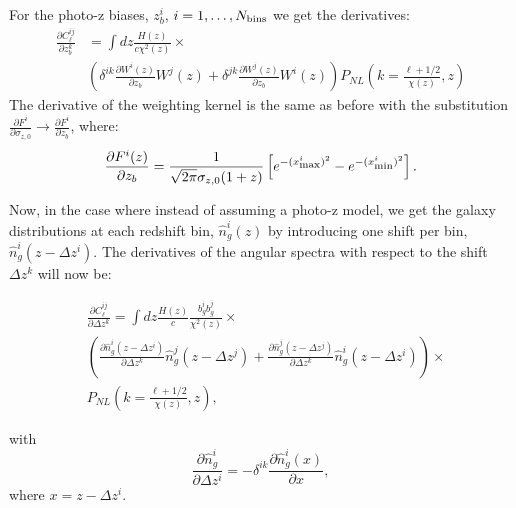 \documentclass[a4paper,fleqn,usenatbib]{mnras}
\begin{document}
For the photo-z biases, $z_b^i$, $i = 1, \dots, N_{\mbox{\scriptsize{bins}}}$ we get the derivatives:
\begin{align}
\frac{\partial C_\ell^{ij}}{\partial z_b^k}  &=  \int  dz \frac{H(z)}{c \chi^2(z)}  \times \nonumber \\   
 & \left(\delta^{ik}\frac{\partial  W^i(z)}{\partial z_b} W^j(z) +
 \delta^{jk}\frac{\partial W^j(z)}{\partial z_b} W^i(z)  \right)P_{NL}\left(k=\frac{\ell+1/2}{\chi(z)},z \right) 
\end{align}
The derivative of the weighting kernel is the same as before with the substitution $\frac{\partial F^i}{\partial \sigma_{z,0}} \to \frac{\partial F^i}{\partial z_b}$, where:
\begin{equation}
\frac{\partial F^i(z)}{\partial z_b}  = \frac{1}{\sqrt{2\pi}\sigma_{z,0}(1+z)} \left[e^{- (x_{\mbox{\scriptsize{max}}}^i)^2} - e^{- (x_{\mbox{\scriptsize{min}}}^i)^2} \right].
\end{equation}

Now, in the case where instead of assuming a photo-z model, we get the galaxy  distributions at each redshift bin, $\hat{n}_g^i(z)$ by introducing one shift per bin, $\hat{n}_g^i(z-\Delta z^i)$. The derivatives of the angular spectra with respect to the shift $\Delta z^k$ will now be:

\begin{align}
&\frac{\partial C_\ell^{ij}}{\partial \Delta z^k}  =  \int  dz \frac{H(z)}{c}\frac{b_g^i b_g^j}{\chi^2(z)} \times \nonumber \\   
 & \left(\frac{\partial \hat{n}_g^i(z - \Delta z^i)}{\partial \Delta z^k}\hat{n}_g^j(z - \Delta z^j)  +
 \frac{\partial \hat{n}_g^j(z - \Delta z^j)}{\partial \Delta z^k} \hat{n}_g^i(z - \Delta z^i)   \right) \times \nonumber \\
 &P_{NL}\left(k=\frac{\ell+1/2}{\chi(z)},z \right), 
\end{align}

with
\begin{equation}
\frac{\partial \hat{n}_g^i}{\partial \Delta z^i} = - \delta^{ik} \frac{\partial \hat{n}_g^i(x)}{\partial x},
\end{equation}
where $x = z - \Delta z^i$.






\bsp	%
\label{lastpage}
\end{document}
